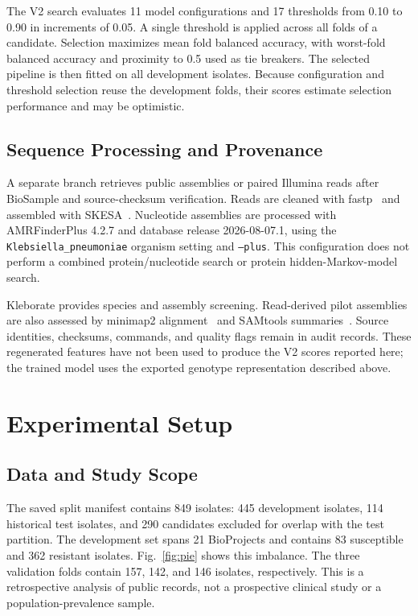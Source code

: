 \documentclass[conference]{IEEEtran}
\begin{document}
The V2 search evaluates 11 model configurations and 17 thresholds from 0.10 to 0.90 in increments of 0.05. A single threshold is applied across all folds of a candidate. Selection maximizes mean fold balanced accuracy, with worst-fold balanced accuracy and proximity to 0.5 used as tie breakers. The selected pipeline is then fitted on all development isolates. Because configuration and threshold selection reuse the development folds, their scores estimate selection performance and may be optimistic.

\subsection{Sequence Processing and Provenance}
A separate branch retrieves public assemblies or paired Illumina reads after BioSample and source-checksum verification. Reads are cleaned with fastp~\cite{fastp} and assembled with SKESA~\cite{skesa}. Nucleotide assemblies are processed with AMRFinderPlus 4.2.7 and database release 2026-08-07.1, using the \texttt{Klebsiella\_pneumoniae} organism setting and \texttt{--plus}. This configuration does not perform a combined protein/nucleotide search or protein hidden-Markov-model search.

Kleborate provides species and assembly screening. Read-derived pilot assemblies are also assessed by minimap2 alignment~\cite{minimap} and SAMtools summaries~\cite{samtools}. Source identities, checksums, commands, and quality flags remain in audit records. These regenerated features have not been used to produce the V2 scores reported here; the trained model uses the exported genotype representation described above.

\section{Experimental Setup}
\subsection{Data and Study Scope}
The saved split manifest contains 849 isolates: 445 development isolates, 114 historical test isolates, and 290 candidates excluded for overlap with the test partition. The development set spans 21 BioProjects and contains 83 susceptible and 362 resistant isolates. Fig.~\ref{fig:pie} shows this imbalance. The three validation folds contain 157, 142, and 146 isolates, respectively. This is a retrospective analysis of public records, not a prospective clinical study or a population-prevalence sample.
\end{document}
